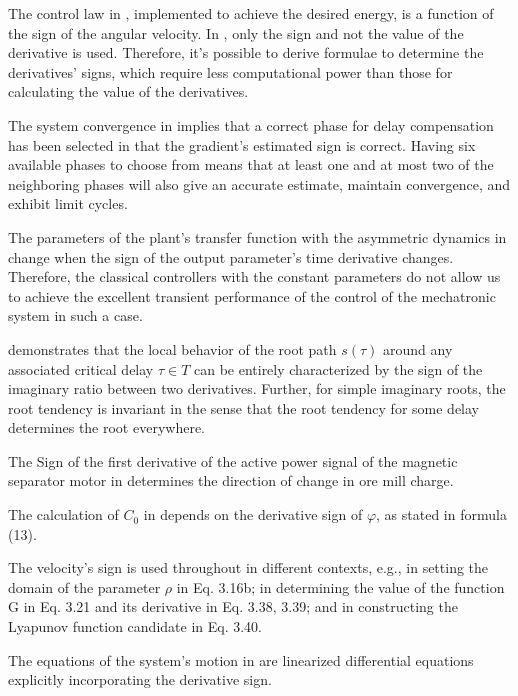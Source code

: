 \documentclass[11pt]{book}
\begin{document}
The control law in \cite{huang2000control}, implemented to achieve
the desired energy, is a function of the sign of the angular velocity.
In \cite{valishevsky2002adaptive}, only the sign and not the value
of the derivative is used. Therefore, it's possible to derive formulae
to determine the derivatives' signs, which require less computational
power than those for calculating the value of the derivatives.

The system convergence in \cite{loizos2008adaptive} implies that
a correct phase for delay compensation has been selected in that the
gradient's estimated sign is correct. Having six available phases
to choose from means that at least one and at most two of the neighboring
phases will also give an accurate estimate, maintain convergence,
and exhibit limit cycles.

The parameters of the plant's transfer function with the asymmetric
dynamics in \cite{zlosnikas2008integral} change when the sign of
the output parameter's time derivative changes. Therefore, the classical
controllers with the constant parameters do not allow us to achieve
the excellent transient performance of the control of the mechatronic
system in such a case.

\cite{jarlebring2010invariance} demonstrates that the local behavior
of the root path $s\left(\tau\right)$ around any associated critical
delay $\tau\in T$ can be entirely characterized by the sign of the
imaginary ratio between two derivatives. Further, for simple imaginary
roots, the root tendency is invariant in the sense that the root tendency
for some delay determines the root everywhere.

The Sign of the first derivative of the active power signal of the
magnetic separator motor in \cite{alekseyev2014automated} determines
the direction of change in ore mill charge.

The calculation of $C_{0}$ in \cite{lumbreras2018stability} depends
on the derivative sign of $\varphi$, as stated in formula (13).

The velocity's sign is used throughout \cite{kikuuwe2018some} in
different contexts, e.g., in setting the domain of the parameter $\rho$
in Eq. 3.16b; in determining the value of the function G in Eq. 3.21
and its derivative in Eq. 3.38, 3.39; and in constructing the Lyapunov
function candidate in Eq. 3.40.

The equations of the system's motion in \cite{romacevych2019closed}
are linearized differential equations explicitly incorporating the
derivative sign.
\end{document}
